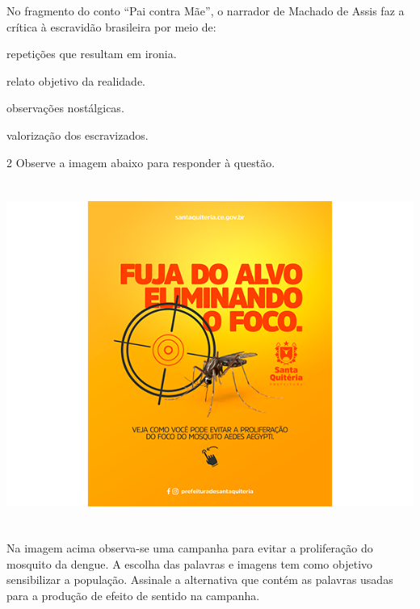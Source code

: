 No fragmento do conto ``Pai contra Mãe'', o narrador de Machado de Assis faz a crítica
à escravidão brasileira por meio de:

\begin{escolha}

  \item repetições que resultam em ironia.
  
  \item relato objetivo da realidade.
  
  \item observações nostálgicas. 
  
  \item valorização dos escravizados. 

\end{escolha}

\num{2} Observe a imagem abaixo para responder à questão.


\includegraphics[width=5.90551in,height=4.43056in]{./imgSAEB_7_POR/media/image6.png}


Na imagem acima observa-se uma campanha para evitar a proliferação do
mosquito da dengue. A escolha das palavras e imagens tem como objetivo
sensibilizar a população. Assinale a alternativa que contém as palavras
usadas para a produção de efeito de sentido na campanha. 


